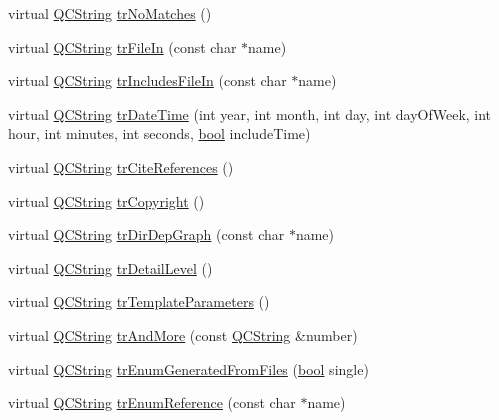 \begin{DoxyCompactItemize}
\item 
virtual \hyperlink{class_q_c_string}{Q\+C\+String} \hyperlink{class_translator_german_a9e9d15260ea7a7f3bf70d315088e75a5}{tr\+No\+Matches} ()
\item 
virtual \hyperlink{class_q_c_string}{Q\+C\+String} \hyperlink{class_translator_german_a398ba2ade80d8a8f9bbef1d91f8406cd}{tr\+File\+In} (const char $\ast$name)
\item 
virtual \hyperlink{class_q_c_string}{Q\+C\+String} \hyperlink{class_translator_german_a98a9d1fbee548039b81bf697cff4519e}{tr\+Includes\+File\+In} (const char $\ast$name)
\item 
virtual \hyperlink{class_q_c_string}{Q\+C\+String} \hyperlink{class_translator_german_a4fa0e3cf73ad2b63a6c475156201408b}{tr\+Date\+Time} (int year, int month, int day, int day\+Of\+Week, int hour, int minutes, int seconds, \hyperlink{qglobal_8h_a1062901a7428fdd9c7f180f5e01ea056}{bool} include\+Time)
\item 
virtual \hyperlink{class_q_c_string}{Q\+C\+String} \hyperlink{class_translator_german_a1125598ba94e63c406d69ca023105f68}{tr\+Cite\+References} ()
\item 
virtual \hyperlink{class_q_c_string}{Q\+C\+String} \hyperlink{class_translator_german_a13ee81537aed375dfc8abc9d5e3c380f}{tr\+Copyright} ()
\item 
virtual \hyperlink{class_q_c_string}{Q\+C\+String} \hyperlink{class_translator_german_ae830a2c9591c04c380c62b5739804799}{tr\+Dir\+Dep\+Graph} (const char $\ast$name)
\item 
virtual \hyperlink{class_q_c_string}{Q\+C\+String} \hyperlink{class_translator_german_af424459fd7a15e7a67a74ea2db13d682}{tr\+Detail\+Level} ()
\item 
virtual \hyperlink{class_q_c_string}{Q\+C\+String} \hyperlink{class_translator_german_ab94de36fa089331344a018336ad468d4}{tr\+Template\+Parameters} ()
\item 
virtual \hyperlink{class_q_c_string}{Q\+C\+String} \hyperlink{class_translator_german_a33603e7bd7ea2c17613d4ea92bf2a61b}{tr\+And\+More} (const \hyperlink{class_q_c_string}{Q\+C\+String} \&number)
\item 
virtual \hyperlink{class_q_c_string}{Q\+C\+String} \hyperlink{class_translator_german_ae855091a10623ee2d849d12e3e2af8a7}{tr\+Enum\+Generated\+From\+Files} (\hyperlink{qglobal_8h_a1062901a7428fdd9c7f180f5e01ea056}{bool} single)
\item 
virtual \hyperlink{class_q_c_string}{Q\+C\+String} \hyperlink{class_translator_german_ad018b4fccab9a1c57d5567774f155083}{tr\+Enum\+Reference} (const char $\ast$name)

\end{DoxyCompactItemize}
